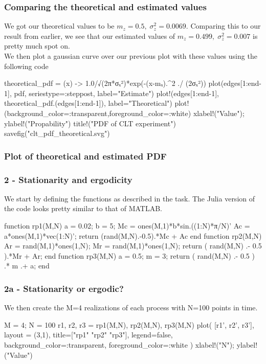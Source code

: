\documentclass[compress]{beamer}
\begin{document}
\begin{frame}[fragile]
    \frametitle{Comparing the theoretical and estimated values}
    We got our theoretical values to be $m_z=0.5,\; \sigma_z^2=0.0069$.
    Comparing this to our result from earlier, we see that our estimated
    values of $m_z=0.499,\; \sigma_z^2=0.007$ is pretty much spot on. \\
    \medskip
    We then plot a gaussian curve over our previous plot with these values
    using the following code
    \begin{jllisting}[gobble=8]
        theoretical_pdf = (x) -> 1.0/√(2π*σₓ²)*exp(-(x-mₓ).^2 ./ (2σₓ²))
        plot(edges[1:end-1], pdf, seriestype=:steppost, label="Estimate")
        plot!(edges[1:end-1], theoretical_pdf.(edges[1:end-1]), label="Theoretical")
        plot!(background_color=:transparent,foreground_color=:white)
        xlabel!("Value"); ylabel!("Propability")
        title!("PDF of CLT experiment")
        savefig("clt_pdf_theoretical.svg")
    \end{jllisting}
\end{frame}

\begin{frame}
    \frametitle{Plot of theoretical and estimated PDF}
    \begin{figure}
        
    \end{figure}
\end{frame}

\begin{frame}[fragile]
    \frametitle{2 - Stationarity and ergodicity}
    We start by defining the functions as described in the task. The Julia
    version of the code looks pretty similar to that of MATLAB.
    \begin{jllisting}[gobble=8]
        function rp1(M,N)
            a = 0.02; b = 5;
            Mc = ones(M,1)*b*sin.((1:N)*π/N)'
            Ac = a*ones(M,1)*vec(1:N)';
            return (rand(M,N).-0.5).*Mc + Ac
        end
        function rp2(M,N)
            Ar = rand(M,1)*ones(1,N);
            Mr = rand(M,1)*ones(1,N); 
            return ( rand(M,N) .- 0.5 ).*Mr + Ar;
        end
        function rp3(M,N)
            a = 0.5; m = 3;
            return ( rand(M,N) .- 0.5 ) .* m .+ a;
        end
    \end{jllisting}
\end{frame}
 
\begin{frame}[fragile]
    \frametitle{2a - Stationarity or ergodic?}
    We then create the M=4 realizations of each process with N=100 points
    in time.
    \begin{jllisting}[gobble=8]
        M = 4; N = 100
        r1, r2, r3 = rp1(M,N), rp2(M,N), rp3(M,N)
        plot(
            [r1', r2', r3'], layout = (3,1), 
            title=["rp1" "rp2" "rp3"], legend=false,
            background_color=:transparent,
            foreground_color=:white
        )
        xlabel!("N"); ylabel!("Value")
    \end{jllisting}
\end{frame}
\end{document}
